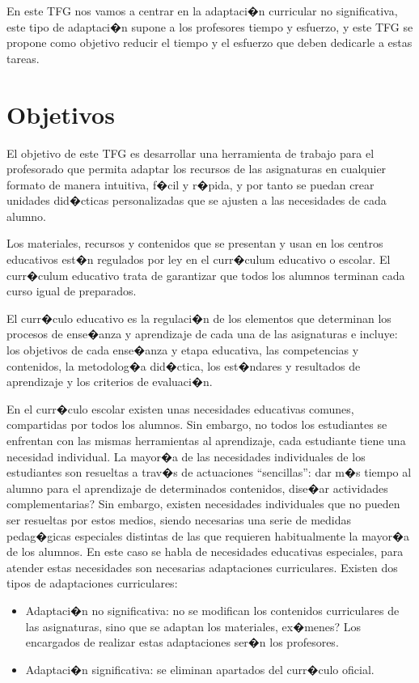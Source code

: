 En este TFG nos vamos a centrar en la adaptaci�n curricular no significativa, este tipo de adaptaci�n supone a los profesores tiempo y esfuerzo, y este TFG se propone como objetivo reducir el tiempo y el esfuerzo que deben dedicarle a estas tareas.


\section{Objetivos}
El objetivo de este TFG es desarrollar una herramienta de trabajo para el profesorado que permita adaptar los recursos de las asignaturas en cualquier formato de manera intuitiva, f�cil y r�pida, y por tanto se puedan crear unidades did�cticas personalizadas que se ajusten a las necesidades de cada alumno. 

Los materiales, recursos y contenidos que se presentan y usan en los centros educativos est�n regulados por ley en el curr�culum educativo o escolar. El curr�culum educativo trata de garantizar que todos los alumnos terminan cada curso igual de preparados.

El curr�culo educativo es la regulaci�n de los elementos que determinan los procesos de ense�anza y aprendizaje de cada una de las asignaturas e incluye: los objetivos de cada ense�anza y etapa educativa, las competencias y contenidos, la metodolog�a did�ctica, los est�ndares y resultados de aprendizaje y los criterios de evaluaci�n.

En el curr�culo escolar existen unas necesidades educativas comunes, compartidas por todos los alumnos. Sin embargo, no todos los estudiantes se enfrentan con las mismas herramientas al aprendizaje, cada estudiante tiene una necesidad individual. La mayor�a de las necesidades individuales de los estudiantes son resueltas a trav�s de actuaciones ``sencillas'': dar m�s tiempo al alumno para el aprendizaje de determinados contenidos, dise�ar actividades complementarias? Sin embargo, existen necesidades individuales que no pueden ser resueltas por estos medios, siendo necesarias una serie de medidas pedag�gicas especiales distintas de las que requieren habitualmente la mayor�a de los alumnos. En este caso se habla de necesidades educativas especiales, para atender estas necesidades son necesarias adaptaciones curriculares. Existen dos tipos de adaptaciones curriculares:

\begin{itemize}
	\item Adaptaci�n no significativa: no se modifican los contenidos curriculares de las asignaturas, sino que se adaptan los materiales, ex�menes? Los encargados de realizar estas adaptaciones ser�n los profesores.
	\item Adaptaci�n significativa: se eliminan apartados del curr�culo oficial.
\end{itemize}

